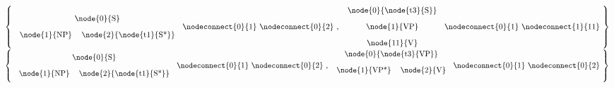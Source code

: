 



\vspace*{2ex}
$\left \{
\mbox{
\begin{tabular}{cc}
\multicolumn{2}{c}{\node{0}{S}} \\[2ex]
\node{1}{NP} & \node{2}{\node{t1}{S*}}
\end{tabular}
\nodeconnect{0}{1} \nodeconnect{0}{2}
}
,
\mbox{
\begin{tabular}{c}
\node{0}{\node{t3}{S}} \\[2ex]
\node{1}{VP} \\[2ex]
\node{11}{V}
\end{tabular}
\nodeconnect{0}{1} \nodeconnect{1}{11}   
}
\right \}$
{\makedash{2pt}
}
% 
% 
$\left \{
\mbox{
\begin{tabular}{cc}
\multicolumn{2}{c}{\node{0}{S}} \\[2ex]
\node{1}{NP} & \node{2}{\node{t1}{S*}}
\end{tabular}
\nodeconnect{0}{1} \nodeconnect{0}{2}
}
,
\mbox{
\begin{tabular}{ccc}
\multicolumn{2}{c}{\node{0}{\node{t3}{VP}}} \\[2ex]
\node{1}{VP*} & \node{2}{V} \\[2ex]
\end{tabular}
\nodeconnect{0}{1} \nodeconnect{0}{2}
}
\right \}$
{\makedash{2pt}
}



